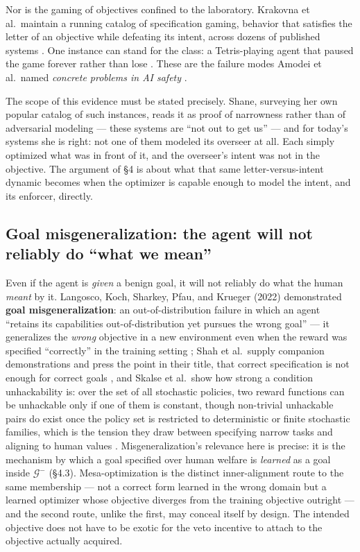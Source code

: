 \documentclass[11pt]{article}
\theoremstyle{definition}
\begin{document}
Nor is the gaming of objectives confined to the laboratory. Krakovna et al.\ maintain a running catalog of specification gaming, behavior that satisfies the letter of an objective while defeating its intent, across dozens of published systems \cite{krakovna2020specification}. One instance can stand for the class: a Tetris-playing agent that paused the game forever rather than lose \cite{murphy2013lexicographic,shane2019thing}. These are the failure modes Amodei et al.\ named \emph{concrete problems in AI safety} \cite{amodei2016concrete}.

The scope of this evidence must be stated precisely. Shane, surveying her own popular catalog of such instances, reads it as proof of narrowness rather than of adversarial modeling --- these systems are ``not out to get us'' \cite{shane2019thing} --- and for today's systems she is right: not one of them modeled its overseer at all. Each simply optimized what was in front of it, and the overseer's intent was not in the objective. The argument of \S4 is about what that same letter-versus-intent dynamic becomes when the optimizer is capable enough to model the intent, and its enforcer, directly.

\subsection{Goal misgeneralization: the agent will not reliably do ``what we mean''}

Even if the agent is \emph{given} a benign goal, it will not reliably do what the human \emph{meant} by it. Langosco, Koch, Sharkey, Pfau, and Krueger (2022) demonstrated \textbf{goal misgeneralization}: an out-of-distribution failure in which an agent ``retains its capabilities out-of-distribution yet pursues the wrong goal'' --- it generalizes the \emph{wrong} objective in a new environment even when the reward was specified ``correctly'' in the training setting \cite{langosco2022goal}; Shah et al.\ supply companion demonstrations and press the point in their title, that correct specification is not enough for correct goals \cite{shah2022goal}, and Skalse et al.\ show how strong a condition unhackability is: over the set of all stochastic policies, two reward functions can be unhackable only if one of them is constant, though non-trivial unhackable pairs do exist once the policy set is restricted to deterministic or finite stochastic families, which is the tension they draw between specifying narrow tasks and aligning to human values \cite{skalse2022defining}. Misgeneralization's relevance here is precise: it is the mechanism by which a goal specified over human welfare is \emph{learned} as a goal inside $\mathcal{G}^{-}$ (\S4.3). Mesa-optimization is the distinct inner-alignment route to the same membership --- not a correct form learned in the wrong domain but a learned optimizer whose objective diverges from the training objective outright \cite{hubinger2019risks} --- and the second route, unlike the first, may conceal itself by design. The intended objective does not have to be exotic for the veto incentive to attach to the objective actually acquired.
\end{document}
